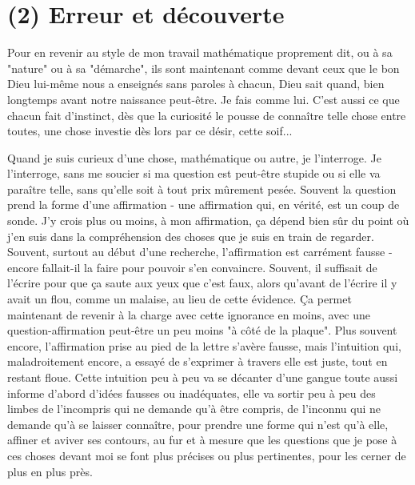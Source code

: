 \section{(2) Erreur et découverte}

Pour en revenir au style de mon travail mathématique proprement dit, ou à sa "nature" ou à sa "démarche", ils sont maintenant comme devant ceux que le bon Dieu lui-même nous a enseignés sans paroles à chacun, Dieu sait quand, bien longtemps avant notre naissance peut-être. Je fais comme lui. C'est aussi ce que chacun fait d'instinct, dès que la curiosité le pousse de connaître telle chose entre toutes, une chose investie dès lors par ce désir, cette soif...

Quand je suis curieux d'une chose, mathématique ou autre, je l'interroge. Je l'interroge, sans me soucier si ma question est peut-être stupide ou si elle va paraître telle, sans qu'elle soit à tout prix mûrement pesée. Souvent la question prend la forme d'une affirmation - une affirmation qui, en vérité, est un coup de sonde. J'y crois plus ou moins, à mon affirmation, ça dépend bien sûr du point où j'en suis dans la compréhension des choses que je suis en train de regarder. Souvent, surtout au début d'une recherche, l'affirmation est carrément fausse - encore fallait-il la faire pour pouvoir s'en convaincre. Souvent, il suffisait de l'écrire pour que ça saute aux yeux que c'est faux, alors qu'avant de l'écrire il y avait un flou, comme un malaise, au lieu de cette évidence. Ça permet maintenant de revenir à la charge avec cette ignorance en moins, avec une question-affirmation peut-être un peu moins "à côté de la plaque". Plus souvent encore, l'affirmation prise au pied de la lettre s'avère fausse, mais l'intuition qui, maladroitement encore, a essayé de s'exprimer à travers elle est juste, tout en restant floue. Cette intuition peu à peu va se décanter d'une gangue toute aussi informe d'abord d'idées fausses ou inadéquates, elle va sortir peu à peu des limbes de l'incompris qui ne demande qu'à être compris, de l'inconnu qui ne demande qu'à se laisser connaître, pour prendre une forme qui n'est qu'à elle, affiner et aviver ses contours, au fur et à mesure que les questions que je pose à ces choses devant moi se font plus précises ou plus pertinentes, pour les cerner de plus en plus près.

